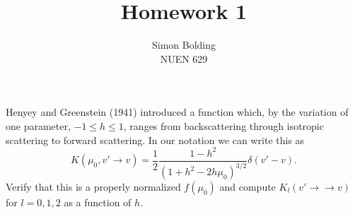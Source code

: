 \documentclass[12pt]{article}
\newenvironment{problem}[2][Problem]{\begin{trivlist}
\item[\hskip \labelsep {\bfseries #1}\hskip \labelsep {\bfseries #2:}]\hspace{0.3in}\newline\newline}{\end{trivlist}}
\newenvironment{solution}[1][Solution]{\begin{trivlist}
\item[\hskip \labelsep {\bfseries #1} {\hspace{-0.2em}\bfseries:}]\hspace{0.3in}\newline}{\end{trivlist}}
\begin{document}
 
 
\title{Homework 1}%
\author{Simon Bolding\\ %
NUEN 629} %
 
\maketitle

\clearpage



%

\begin{problem}{1}
Henyey and Greenstein (1941) introduced a function which, by the variation of one
parameter, $−1 \leq h \leq 1$, ranges from backscattering through isotropic scattering to forward scattering. In
our notation we can write this as
\begin{equation}
    K( \mu_0 , v'\rightarrow v) = \frac{1}{2}
    \frac{1-h^2}{\left(1+h^2-2h\mu_0\right)^{3/2}}\delta(v'-v).
\end{equation}
Verify that this is a properly normalized $f ( \mu_0 )$ and compute $K_l (v'
\rightarrow → v)$ for $l = 0, 1, 2$ as a function of $h$.

\end{problem}

\begin{solution}

\end{solution}
\clearpage
\end{document}
